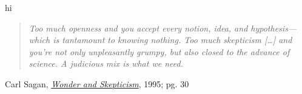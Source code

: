 hi


\pagebreak

\begin{quote}
    \textit{Too much openness and you accept every notion, idea, and hypothesis—which is tantamount to knowing nothing. Too much skepticism […] and you're not only unpleasantly grumpy, but also closed to the advance of science. A judicious mix is what we need.}
\end{quote}
\begin{flushright}
\textup{Carl Sagan}, \textit{\href{https://cdn.centerforinquiry.org/wp-content/uploads/sites/29/1995/01/22165112/p26.pdf}{Wonder and Skepticism}}, \textup{1995; pg. 30}
\end{flushright}

